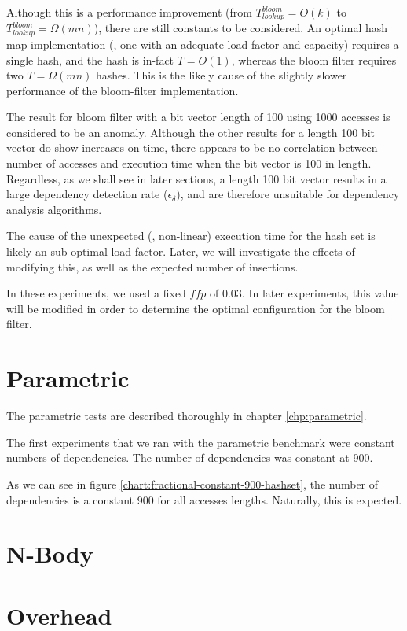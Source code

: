	Although this is a performance improvement (from $T_{lookup}^{bloom}=O(k)$ to $T_{lookup}^{bloom}=\Omega(mn)$), there are still constants to be considered. An optimal hash map implementation (\ie, one with an adequate load factor and capacity) requires a single hash, and the hash is in-fact $T=O(1)$, whereas the bloom filter requires two $T=\Omega(mn)$ hashes. This is the likely cause of the slightly slower performance of the bloom-filter implementation. 
	
	The result for bloom filter with a bit vector length of 100 using 1000 accesses is considered to be an anomaly. Although the other results for a length 100 bit vector do show increases on time, there appears to be no correlation between number of accesses and execution time when the bit vector is 100 in length. Regardless, as we shall see in later sections, a length 100 bit vector results in a large dependency detection rate ($\epsilon_{\delta}$), and are therefore unsuitable for dependency analysis algorithms.
	
	The cause of the unexpected (\ie, non-linear) execution time for the hash set is likely an sub-optimal load factor. Later, we will investigate the effects of modifying this, as well as the expected number of insertions.
	
	In these experiments, we used a fixed $ffp$ of 0.03. In later experiments, this value will be modified in order to determine the optimal configuration for the bloom filter.

\section{Parametric} \label{sec:results/parametric}
The parametric tests are described thoroughly in chapter \ref{chp:parametric}.

The first experiments that we ran with the parametric benchmark were constant numbers of dependencies. The number of dependencies was constant at 900.

As we can see in figure \ref{chart:fractional-constant-900-hashset}, the number of dependencies is a constant 900 for all accesses lengths. Naturally, this is expected.

\section{N-Body} \label{sec:results/nbody}

\section{Overhead} \label{sec:results/overhead}
